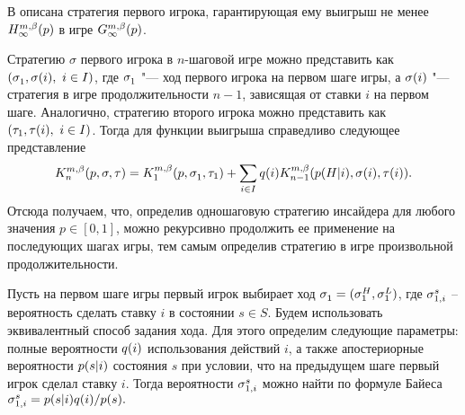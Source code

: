 В  описана стратегия первого игрока, гарантирующая ему выигрыш не менее $\H*{\infty}(p)$ в игре $\theG*{\infty}(p)$.

Стратегию $\sigma$ первого игрока в $n$-шаговой игре можно представить как $(\sigmas{1}, \sigmara{i},\ i \in I)$, где $\sigmas{1}$ "--- ход первого игрока на первом шаге игры, а $\sigma(i)$ "--- стратегия в игре продолжительности $n-1$, зависящая от ставки $i$ на первом шаге.
Аналогично, стратегию второго игрока можно представить как $(\tau_{1}, \tau(i),\ i \in I)$.
Тогда для функции выигрыша справедливо следующее представление
\begin{equation}
  \label{ch1:eq:recursive-structure}
  \K*{n}(p,\sigmar,\taur) = 
  \K*{1}(p,\sigmas{1},\taus{1}) + \sum_{i \in I} \qc{i} \K*{n-1}(\pac{H}{i},\sigmara{i},\taura{i}).
\end{equation}
Отсюда получаем, что, определив одношаговую стратегию инсайдера для любого значения $p \in [0,1]$, можно рекурсивно продолжить ее применение на последующих шагах игры, тем самым определив стратегию в игре произвольной продолжительности.

Пусть на первом шаге игры первый игрок выбирает ход %
$\sigmas{1} = (\sigmas[H]{1}, \sigmas[L]{1})$, где %
$\sigmasc[s]{i}$ -- вероятность сделать ставку $i$ в состоянии $s \in S$.
%
Будем использовать эквивалентный способ задания хода.
Для этого определим следующие параметры: полные вероятности $q(i)$ использования действий $i$, а также апостериорные вероятности $p(s|i)$ состояния $s$ при условии, что на предыдущем шаге первый игрок сделал ставку $i$.
Тогда вероятности $\sigmasc[s]{i}$ можно найти по формуле Байеса
$
  \sigmasc[s]{i} = \pac{s}{i}\qc{i}/\pc{s}.
$

